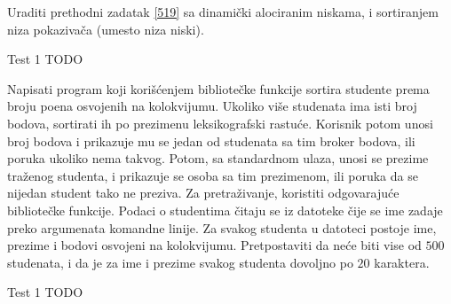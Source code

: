 \begin{Exercise}[label=520]
  Uraditi prethodni zadatak \ref{519} sa dinamički alociranim niskama,
  i sortiranjem niza pokazivača (umesto niza niski).
  
\begin{miditest}
\begin{test}{Test 1}
TODO
\end{test}
\end{miditest}
  
\end{Exercise}

\begin{Exercise}[label=521]
  Napisati program koji korišćenjem bibliotečke funkcije 
  sortira studente prema broju poena osvojenih na kolokvijumu. Ukoliko
  više studenata ima isti broj bodova, sortirati ih po prezimenu
  leksikografski rastuće. Korisnik potom unosi broj bodova i prikazuje
  mu se jedan od studenata sa tim broker bodova, ili poruka ukoliko
  nema takvog. Potom, sa standardnom ulaza, unosi se prezime traženog
  studenta, i prikazuje se osoba sa tim prezimenom, ili poruka da se
  nijedan student tako ne preziva. Za pretraživanje, koristiti
  odgovarajuće bibliotečke funkcije. Podaci o studentima čitaju se iz
  datoteke čije se ime zadaje preko argumenata komandne linije. Za
  svakog studenta u datoteci postoje ime, prezime i bodovi osvojeni na
  kolokvijumu. Pretpostaviti da neće biti vise od $500$ studenata, i
  da je za ime i prezime svakog studenta dovoljno po $20$ karaktera.
  
\begin{miditest}
\begin{test}{Test 1}
TODO
\end{test}
\end{miditest}
  
\end{Exercise}

